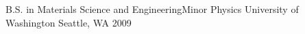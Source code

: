 


\begin{cventries}


\cventry
{B.S. in Materials Science and Engineering{\quad\textbar\quad}Minor Physics} %
{University of Washington} %
{Seattle, WA} %
{2009} %
{ %
}


\end{cventries}